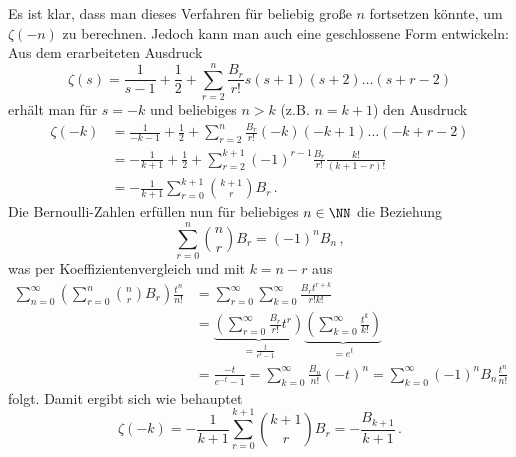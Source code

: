 \begin{bewe} %
Es ist klar, dass man dieses Verfahren für beliebig große $n$ fortsetzen könnte, um $\zeta(-n)$ zu berechnen. Jedoch kann man auch eine geschlossene Form entwickeln: Aus dem erarbeiteten Ausdruck 
\[
	\zeta(s)
	= \frac 1{s-1} + \frac 12 + \sum_{r=2}^n \frac{B_r}{r!} s(s+1)(s+2)\ldots(s+r-2)
\]
erhält man für $s = -k$ und beliebiges $n > k$ (z.B. $n = k+1$) den Ausdruck
\begin{align*}
	\zeta(-k)
	&= \frac 1{-k-1} + \frac 12 + \sum_{r=2}^n \frac {B_r}{r!} (-k)(-k+1) \ldots (-k+r-2) \\
	&= - \frac 1{k+1} + \frac 12 + \sum_{r=2}^{k+1} (-1)^{r-1} \frac {B_r}{r!} \frac {k!}{(k+1-r)!} \\
	&= - \frac 1{k+1} \sum_{r=0}^{k+1} \binom {k+1}r B_r
	\,.
\end{align*}
Die Bernoulli-Zahlen erfüllen nun für beliebiges $n \in \NN$ die Beziehung
\[
	\sum_{r=0}^n \binom nr B_r = (-1)^n B_n
	\,,
\]
was per Koeffizientenvergleich und mit $k = n-r$ aus
\begin{align*}
	\sum_{n=0}^\infty \left( \sum_{r=0}^n \binom nr B_r \right) \frac {t^n}{n!}
	&= \sum_{r=0}^\infty \sum_{k=0}^\infty \frac {B_r t^{r+k}}{r!k!} \\
	&= \underbrace{\left( \sum_{r=0}^\infty \frac {B_r}{r!} t^r \right)}_{= \frac t{e^t - 1}} \underbrace{\left( \sum_{k=0}^\infty \frac {t^k}{k!} \right)}_{= e^t} \\
	&= \frac {-t}{e^{-t} - 1}
	= \sum_{k=0}^\infty \frac {B_n}{n!} (-t)^n
	= \sum_{k=0}^\infty (-1)^n B_n \frac {t^n}{n!}
\end{align*}
folgt. Damit ergibt sich wie behauptet
\[
	\zeta(-k) = - \frac 1{k+1} \sum_{r=0}^{k+1} \binom {k+1}r B_r = - \frac {B_{k+1}}{k+1}
	\,.
\]


\end{bewe}
